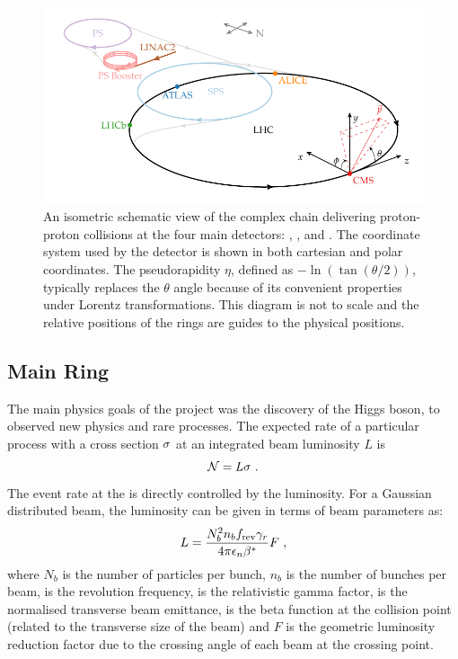 \begin{figure}[htb]
    \centering
    \includegraphics{diagrams/tikz/lhc_complex/lhc_complex.pdf}
    \caption[Schematic view of the LHC complex.]{
        An isometric schematic view of the \LHC complex chain delivering proton-proton collisions at the four main detectors: \LHCb, \ATLAS, \ALICE and \CMS. The coordinate system used by the \CMS detector is shown in both cartesian and polar coordinates. The pseudorapidity $\eta$, defined as $-\ln(\tan(\theta/2))$, typically replaces the $\theta$ angle because of its convenient properties under Lorentz transformations. This diagram is not to scale and the relative positions of the rings are guides to the physical positions.
    }
    \label{fig:LHC-Complex}
\end{figure}


\subsection{\LHC Main Ring}

The main physics goals of the \LHC project was the discovery of the Higgs boson, to observed new physics and rare \SM processes. The expected rate of a particular process with a cross section $\sigma$ at an integrated beam luminosity $L$ is
%
\begin{equation}
    \mathcal{N} = L \sigma \ .
\end{equation}
%
The event rate at the \LHC is directly controlled by the luminosity. For a Gaussian distributed beam, the luminosity can be given in terms of beam parameters as:
%
\begin{equation}
    \label{eq:beam-lumi}
    L = \frac{N_b^2 n_bf_{\mathrm{rev}}\gamma_{r}}{4\pi\epsilon_n\beta^*} F\ ,
\end{equation}
%
where $N_b$ is the number of particles per bunch, $n_b$ is the number of bunches per beam, \frev is the revolution frequency, \relgamma is the relativistic gamma factor, \emitt is the normalised transverse beam emittance, \bstar is the beta function at the collision point (related to the transverse size of the beam) and $F$ is the geometric luminosity reduction factor due to the crossing angle of each beam at the crossing point.

